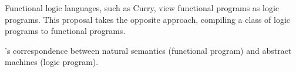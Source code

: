 Functional logic languages, such as Curry\cite{Hanus:Ganzinger13}, view functional programs as logic programs.
This proposal takes the opposite approach, compiling a class of logic programs to functional programs.

\citeauthor{Simmons-Zerny:LICS13}'s correspondence between natural semantics (functional program) and abstract machines (logic program)\autocite{Simmons-Zerny:LICS13}.

